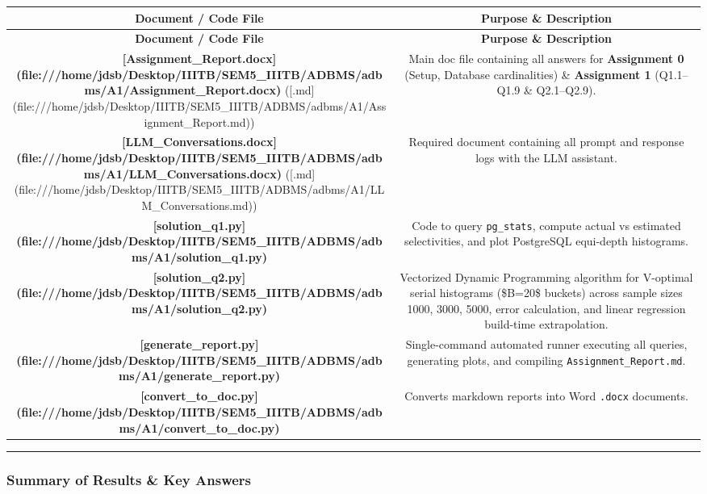 \documentclass[11pt,a4paper]{article}
\begin{document}
{{\begingroup
\small
\setlength{\tabcolsep}{4pt}
\begin{xltabular}{\textwidth}{C | C}
\toprule
\textbf{Document / Code File} & \textbf{Purpose \& Description} \\
\midrule
\endfirsthead
\toprule
\textbf{Document / Code File} & \textbf{Purpose \& Description} \\
\midrule
\endfirsthead
\endhead
\bottomrule
\endfoot
\bottomrule
\endlastfoot
\textbf{[Assignment\_Report.docx](file:///home/jdsb/Desktop/IIITB/SEM5\_IIITB/ADBMS/adbms/A1/Assignment\_Report.docx)} ([.md](file:///home/jdsb/Desktop/IIITB/SEM5\_IIITB/ADBMS/adbms/A1/Assignment\_Report.md)) & Main doc file containing all answers for \textbf{Assignment 0} (Setup, Database cardinalities) \& \textbf{Assignment 1} (Q1.1–Q1.9 \& Q2.1–Q2.9). \\
\textbf{[LLM\_Conversations.docx](file:///home/jdsb/Desktop/IIITB/SEM5\_IIITB/ADBMS/adbms/A1/LLM\_Conversations.docx)} ([.md](file:///home/jdsb/Desktop/IIITB/SEM5\_IIITB/ADBMS/adbms/A1/LLM\_Conversations.md)) & Required document containing all prompt and response logs with the LLM assistant. \\
\textbf{[solution\_q1.py](file:///home/jdsb/Desktop/IIITB/SEM5\_IIITB/ADBMS/adbms/A1/solution\_q1.py)} & Code to query \texttt{pg\_stats}, compute actual vs estimated selectivities, and plot PostgreSQL equi-depth histograms. \\
\textbf{[solution\_q2.py](file:///home/jdsb/Desktop/IIITB/SEM5\_IIITB/ADBMS/adbms/A1/solution\_q2.py)} & Vectorized Dynamic Programming algorithm for V-optimal serial histograms (\$B=20\$ buckets) across sample sizes 1000, 3000, 5000, error calculation, and linear regression build-time extrapolation. \\
\textbf{[generate\_report.py](file:///home/jdsb/Desktop/IIITB/SEM5\_IIITB/ADBMS/adbms/A1/generate\_report.py)} & Single-command automated runner executing all queries, generating plots, and compiling \texttt{Assignment\_Report.md}. \\
\textbf{[convert\_to\_doc.py](file:///home/jdsb/Desktop/IIITB/SEM5\_IIITB/ADBMS/adbms/A1/convert\_to\_doc.py)} & Converts markdown reports into Word \texttt{.docx} documents. \\
\end{xltabular}
\endgroup}


\hrule


\subsubsection{Summary of Results \& Key Answers}

}
\end{document}
